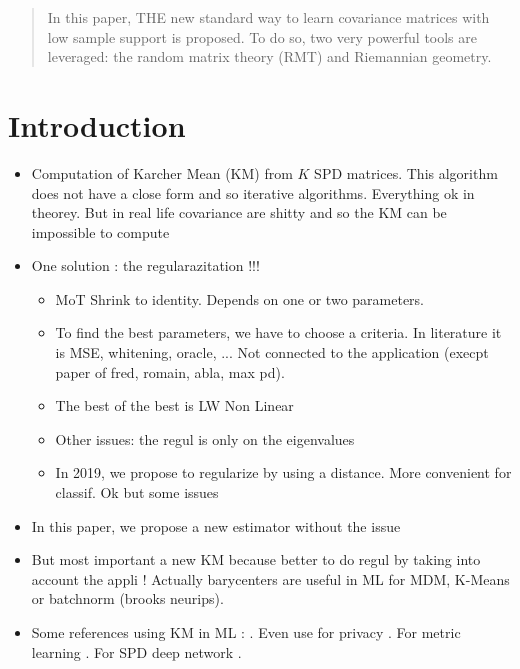 \documentclass{article}
\theoremstyle{plain}
\theoremstyle{definition}
\theoremstyle{remark}
\begin{document}
\printAffiliationsAndNotice{\icmlEqualContribution} %

\begin{abstract}
    In this paper, THE new standard way to learn covariance matrices with low sample support is proposed.
    To do so, two very powerful tools are leveraged: the random matrix theory (RMT) and Riemannian geometry.
\end{abstract}


\section{Introduction}

\begin{itemize}
    \item Computation of Karcher Mean (KM) from $K$ SPD matrices. This algorithm does not have a close form and so iterative algorithms. Everything ok in theorey. But in real life covariance are shitty and so the KM can be impossible to compute
    \item One solution : the regularazitation !!!
    \begin{itemize}
        \item MoT Shrink to identity. Depends on one or two parameters. 
        \item To find the best parameters, we have to choose a criteria. In literature it is MSE, whitening, oracle, ... Not connected to the application (execpt paper of fred, romain, abla, max pd).
        \item The best of the best is LW Non Linear
        \item Other issues: the regul is only on the eigenvalues
        \item In 2019, we propose to regularize by using a distance. More convenient for classif. Ok but some issues        
    \end{itemize}
    \item In this paper, we propose a new estimator without the issue
    \item But most important a new KM because better to do regul by taking into account the appli ! Actually barycenters are useful in ML for MDM, K-Means or batchnorm (brooks neurips). 
    \item Some references using KM in ML : \cite{utpala2023,lou2020}. Even use for privacy \cite{reimherr2021}. For metric learning \cite{zadeh2016}. For SPD deep network \cite{brooks2019riemannian}.
\end{itemize}
\end{document}
